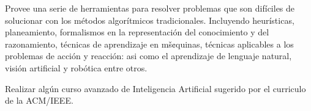 \begin{syllabus}


\begin{justification}
Provee una serie de herramientas para resolver problemas que son difíciles de solucionar con los métodos algorítmicos tradicionales. Incluyendo heurísticas, planeamiento, formalismos en la representación del conocimiento y del razonamiento, técnicas de aprendizaje en mš¢quinas, técnicas aplicables a los problemas de acción y reacción: asi como el aprendizaje de lenguaje natural, visión artificial y robótica entre otros. 
\end{justification}

\begin{goals}
\item Realizar algún curso avanzado de Inteligencia Artificial sugerido por el curriculo de la ACM/IEEE.
\end{goals}

\begin{outcomes}
\item {}
\item {}
\item {}
\item {}
\end{outcomes}

\begin{competences}
\item {} 
\item {} 
\item {}
\end{competences}


\end{syllabus}
